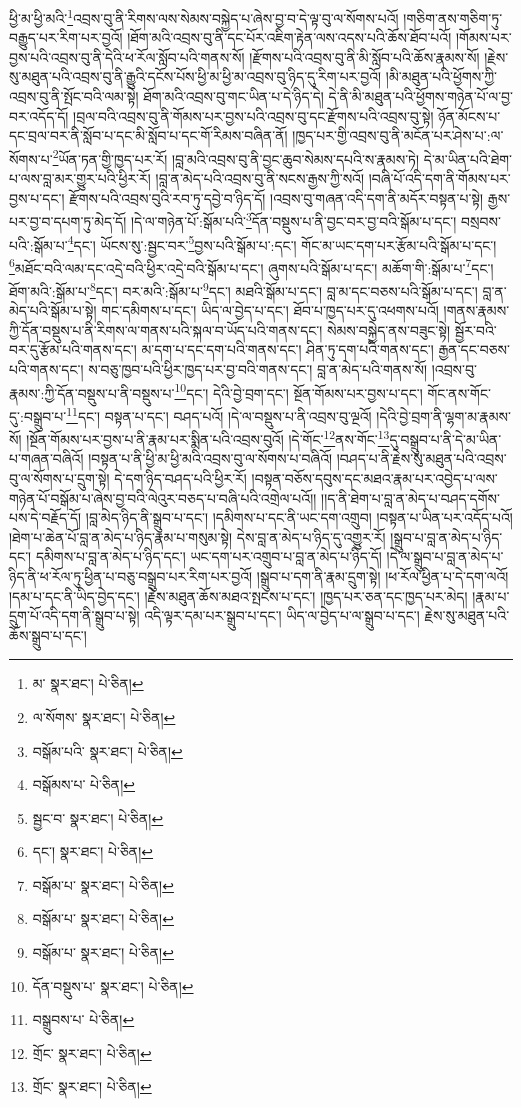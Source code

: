 ཕྱི་མ་ཕྱི་མའི་\footnote{མ་  སྣར་ཐང་།  པེ་ཅིན། }འབྲས་བུ་ནི་རིགས་ལས་སེམས་བསྐྱེད་པ་ཞེས་བྱ་བ་དེ་ལྟ་བུ་ལ་སོགས་པའོ། །གཅིག་ནས་གཅིག་ཏུ་བརྒྱུད་པར་རིག་པར་བྱའོ། །ཐོག་མའི་འབྲས་བུ་ནི་དང་པོར་འཇིག་རྟེན་ལས་འདས་པའི་ཆོས་ཐོབ་པའོ། །གོམས་པར་བྱས་པའི་འབྲས་བུ་ནི་དེའི་ཕ་རོལ་སློབ་པའི་གནས་སོ། །རྫོགས་པའི་འབྲས་བུ་ནི་མི་སློབ་པའི་ཆོས་རྣམས་སོ། །རྗེས་སུ་མཐུན་པའི་འབྲས་བུ་ནི་རྒྱུའི་དངོས་པོས་ཕྱི་མ་ཕྱི་མ་འབྲས་བུ་ཉིད་དུ་རིག་པར་བྱའོ། །མི་མཐུན་པའི་ཕྱོགས་ཀྱི་འབྲས་བུ་ནི་སྤོང་བའི་ལམ་སྟེ། ཐོག་མའི་འབྲས་བུ་གང་ཡིན་པ་དེ་ཉིད་དེ། དེ་ནི་མི་མཐུན་པའི་ཕྱོགས་གཉེན་པོ་ལ་བྱ་བར་འདོད་དོ། །བྲལ་བའི་འབྲས་བུ་ནི་གོམས་པར་བྱས་པའི་འབྲས་བུ་དང་རྫོགས་པའི་འབྲས་བུ་སྟེ། ཉོན་མོངས་པ་དང་བྲལ་བར་ནི་སློབ་པ་དང་མི་སློབ་པ་དང་གོ་རིམས་བཞིན་ནོ། །ཁྱད་པར་གྱི་འབྲས་བུ་ནི་མངོན་པར་ཤེས་པ་:ལ་སོགས་པ་\footnote{ལ་སོགས་  སྣར་ཐང་།  པེ་ཅིན། }ཡོན་ཏན་གྱི་ཁྱད་པར་རོ། །བླ་མའི་འབྲས་བུ་ནི་བྱང་ཆུབ་སེམས་དཔའི་ས་རྣམས་ཏེ། དེ་མ་ཡིན་པའི་ཐེག་པ་ལས་བླ་མར་གྱུར་པའི་ཕྱིར་རོ། །བླ་ན་མེད་པའི་འབྲས་བུ་ནི་སངས་རྒྱས་ཀྱི་སའོ། །བཞི་པོ་འདི་དག་ནི་གོམས་པར་བྱས་པ་དང་། རྫོགས་པའི་འབྲས་བུའི་རབ་ཏུ་དབྱེ་བ་ཉིད་དོ། །འབྲས་བུ་གཞན་འདི་དག་ནི་མདོར་བསྟན་པ་སྟེ། རྒྱས་པར་བྱ་བ་དཔག་ཏུ་མེད་དོ། །དེ་ལ་གཉེན་པོ་:སྒོམ་པའི་\footnote{བསྒོམ་པའི་  སྣར་ཐང་།  པེ་ཅིན། }དོན་བསྡུས་པ་ནི་བྱང་བར་བྱ་བའི་སྒོམ་པ་དང་། བསྲབས་པའི་:སྒོམ་པ་\footnote{བསྒོམས་པ་  པེ་ཅིན། }དང་། ཡོངས་སུ་:སྦྱང་བར་\footnote{སྦྱང་བ་  སྣར་ཐང་།  པེ་ཅིན། }བྱས་པའི་སྒོམ་པ་:དང་། གོང་མ་ཡང་དག་པར་རྩོམ་པའི་སྒོམ་པ་དང་། \footnote{དང་།    སྣར་ཐང་།  པེ་ཅིན། }མཐོང་བའི་ལམ་དང་འདྲེ་བའི་ཕྱིར་འདྲེ་བའི་སྒོམ་པ་དང་། ཞུགས་པའི་སྒོམ་པ་དང་། མཆོག་གི་:སྒོམ་པ་\footnote{བསྒོམ་པ་  སྣར་ཐང་།  པེ་ཅིན། }དང་། ཐོག་མའི་:སྒོམ་པ་\footnote{བསྒོམ་པ་  སྣར་ཐང་།  པེ་ཅིན། }དང་། བར་མའི་:སྒོམ་པ་\footnote{བསྒོམ་པ་  སྣར་ཐང་།  པེ་ཅིན། }དང་། མཐའི་སྒོམ་པ་དང་། བླ་མ་དང་བཅས་པའི་སྒོམ་པ་དང་། བླ་ན་མེད་པའི་སྒོམ་པ་སྟེ། གང་དམིགས་པ་དང་། ཡིད་ལ་བྱེད་པ་དང་། ཐོབ་པ་ཁྱད་པར་དུ་འཕགས་པའོ། །གནས་རྣམས་ཀྱི་དོན་བསྡུས་པ་ནི་རིགས་ལ་གནས་པའི་སྐལ་བ་ཡོད་པའི་གནས་དང་། སེམས་བསྐྱེད་ནས་བཟུང་སྟེ། སྦྱོར་བའི་བར་དུ་རྩོམ་པའི་གནས་དང་། མ་དག་པ་དང་དག་པའི་གནས་དང་། ཤིན་ཏུ་དག་པའི་གནས་དང་། རྒྱན་དང་བཅས་པའི་གནས་དང་། ས་བཅུ་ཁྱབ་པའི་ཕྱིར་ཁྱད་པར་བྱ་བའི་གནས་དང་། བླ་ན་མེད་པའི་གནས་སོ། །འབྲས་བུ་རྣམས་:ཀྱི་དོན་བསྡུས་པ་ནི་བསྡུས་པ་\footnote{དོན་བསྡུས་པ་  སྣར་ཐང་།  པེ་ཅིན། }དང་། དེའི་བྱེ་བྲག་དང་། སྔོན་གོམས་པར་བྱས་པ་དང་། གོང་ནས་གོང་དུ་:བསྒྲུབ་པ་\footnote{བསྒྲུབས་པ་  པེ་ཅིན། }དང་། བསྟན་པ་དང་། བཤད་པའོ། །དེ་ལ་བསྡུས་པ་ནི་འབྲས་བུ་ལྔའོ། །དེའི་བྱེ་བྲག་ནི་ལྷག་མ་རྣམས་སོ། །སྔོན་གོམས་པར་བྱས་པ་ནི་རྣམ་པར་སྨིན་པའི་འབྲས་བུའོ། །དེ་གོང་\footnote{གྲོང་  སྣར་ཐང་།  པེ་ཅིན། }ནས་གོང་\footnote{གྲོང་  སྣར་ཐང་།  པེ་ཅིན། }དུ་བསྒྲུབ་པ་ནི་དེ་མ་ཡིན་པ་གཞན་བཞིའོ། །བསྟན་པ་ནི་ཕྱི་མ་ཕྱི་མའི་འབྲས་བུ་ལ་སོགས་པ་བཞིའོ། །བཤད་པ་ནི་རྗེས་སུ་མཐུན་པའི་འབྲས་བུ་ལ་སོགས་པ་དྲུག་སྟེ། དེ་དག་ཉིད་བཤད་པའི་ཕྱིར་རོ། །བསྟན་བཅོས་དབུས་དང་མཐའ་རྣམ་པར་འབྱེད་པ་ལས་གཉེན་པོ་བསྒོམ་པ་ཞེས་བྱ་བའི་ལེའུར་བཅད་པ་བཞི་པའི་འགྲེལ་པའོ།། །།ད་ནི་ཐེག་པ་བླ་ན་མེད་པ་བཤད་དགོས་པས་དེ་བརྗོད་དོ། །བླ་མེད་ཉིད་ནི་སྒྲུབ་པ་དང་། །དམིགས་པ་དང་ནི་ཡང་དག་འགྲུབ། །བསྟན་པ་ཡིན་པར་འདོད་པའོ། །ཐེག་པ་ཆེན་པོ་བླ་ན་མེད་པ་ཉིད་རྣམ་པ་གསུམ་སྟེ། དེས་བླ་ན་མེད་པ་ཉིད་དུ་འགྱུར་རོ། །སྒྲུབ་པ་བླ་ན་མེད་པ་ཉིད་དང་། དམིགས་པ་བླ་ན་མེད་པ་ཉིད་དང་། ཡང་དག་པར་འགྲུབ་པ་བླ་ན་མེད་པ་ཉིད་དོ། །དེ་ལ་སྒྲུབ་པ་བླ་ན་མེད་པ་ཉིད་ནི་ཕ་རོལ་ཏུ་ཕྱིན་པ་བཅུ་བསྒྲུབ་པར་རིག་པར་བྱའོ། །སྒྲུབ་པ་དག་ནི་རྣམ་དྲུག་སྟེ། །ཕ་རོལ་ཕྱིན་པ་དེ་དག་ལའོ། །དམ་པ་དང་ནི་ཡིད་བྱེད་དང་། །རྗེས་མཐུན་ཆོས་མཐའ་སྤངས་པ་དང་། །ཁྱད་པར་ཅན་དང་ཁྱད་པར་མེད། །རྣམ་པ་དྲུག་པོ་འདི་དག་ནི་སྒྲུབ་པ་སྟེ། འདི་ལྟར་དམ་པར་སྒྲུབ་པ་དང་། ཡིད་ལ་བྱེད་པ་ལ་སྒྲུབ་པ་དང་། རྗེས་སུ་མཐུན་པའི་ཆོས་སྒྲུབ་པ་དང་། 